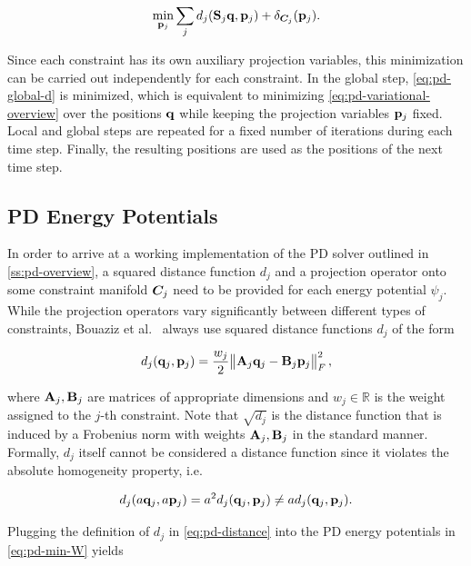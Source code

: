 \begin{equation}\label{eq:pd-local-d}
    \min_{\mathbf{p}_j} \sum_j d_j(\mathbf{S}_j \mathbf{q}, \mathbf{p}_j) + \delta_{\bm{C}_j}(\mathbf{p}_j).
\end{equation}

\noindent Since each constraint has its own auxiliary projection variables, this minimization can be carried out independently 
for each constraint. In the global step, \autoref{eq:pd-global-d} is minimized, which is equivalent to minimizing 
\autoref{eq:pd-variational-overview} over the positions $\mathbf{q}$ while keeping the projection variables $\mathbf{p}_j$ 
fixed. Local and global steps are repeated for a fixed number of iterations during each time step. Finally, the 
resulting positions are used as the positions of the next time step.

\subsection{PD Energy Potentials}\label{ss:pd-potentials}
In order to arrive at a working implementation of the PD solver outlined in \cref{ss:pd-overview}, a squared distance function 
$d_j$ and a projection operator onto some constraint manifold $\bm{C}_j$ need to be provided for each energy potential $\psi_j$. 
While the projection operators vary significantly between different types of constraints, Bouaziz et al.\ \cite{bouaziz2014} 
always use squared distance functions $d_j$ of the form

\begin{equation}\label{eq:pd-distance}
    d_j(\mathbf{q}_j, \mathbf{p}_j) = \frac{w_j}{2} \norm{\mathbf{A}_j\mathbf{q}_j - \mathbf{B}_j\mathbf{p}_j}^2_F,
\end{equation}

\noindent where $\mathbf{A}_j, \mathbf{B}_j$ are matrices of appropriate dimensions and $w_j \in \mathbb{R}$ is the weight assigned to the
$j$-th constraint. Note that $\sqrt{d_j}$ is the distance function that is induced by a Frobenius norm with weights $\mathbf{A}_j, 
\mathbf{B}_j$ in the standard manner. Formally, $d_j$ itself cannot be considered a distance function since it violates the absolute
homogeneity property, i.e. 

\[
    d_j(a\mathbf{q}_j, a\mathbf{p}_j) = a^2d_j(\mathbf{q}_j, \mathbf{p}_j) \neq ad_j(\mathbf{q}_j, \mathbf{p}_j). 
\]


Plugging the definition of $d_j$ in \autoref{eq:pd-distance} into the PD energy potentials in \autoref{eq:pd-min-W} yields

